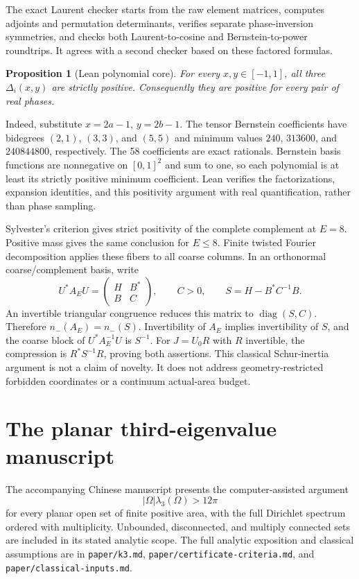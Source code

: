 \documentclass[11pt]{article}
\newtheorem{proposition}{Proposition}
\newcommand{\nminus}{n_{-}}
\begin{document}
The exact Laurent checker starts from the raw element matrices, computes adjoints and permutation determinants, verifies separate phase-inversion symmetries, and checks both Laurent-to-cosine and Bernstein-to-power roundtrips. It agrees with a second checker based on these factored formulas.
\begin{proposition}[Lean polynomial core]
For every $x,y\in[-1,1]$, all three $\Delta_i(x,y)$ are strictly positive. Consequently they are positive for every pair of real phases.
\end{proposition}
Indeed, substitute $x=2a-1$, $y=2b-1$. The tensor Bernstein coefficients have bidegrees $(2,1)$, $(3,3)$, and $(5,5)$ and minimum values $240$, $313600$, and $240844800$, respectively. The 58 coefficients are exact rationals. Bernstein basis functions are nonnegative on $[0,1]^2$ and sum to one, so each polynomial is at least its strictly positive minimum coefficient. Lean verifies the factorizations, expansion identities, and this positivity argument with real quantification, rather than phase sampling.

Sylvester's criterion gives strict positivity of the complete complement at $E=8$. Positive mass gives the same conclusion for $E\leq8$. Finite twisted Fourier decomposition applies these fibers to all coarse columns. In an orthonormal coarse/complement basis, write
\[
 U^*A_EU=\begin{pmatrix}H&B^*\\B&C\end{pmatrix},\qquad C>0,
 \qquad S=H-B^*C^{-1}B.
\]
An invertible triangular congruence reduces this matrix to $\operatorname{diag}(S,C)$. Therefore $\nminus(A_E)=\nminus(S)$. Invertibility of $A_E$ implies invertibility of $S$, and the coarse block of $U^*A_E^{-1}U$ is $S^{-1}$. For $J=U_0R$ with $R$ invertible, the compression is $R^*S^{-1}R$, proving both assertions. This classical Schur-inertia argument is not a claim of novelty. It does not address geometry-restricted forbidden coordinates or a continuum actual-area budget.
\section{The planar third-eigenvalue manuscript}
The accompanying Chinese manuscript presents the computer-assisted argument
\[
 |\Omega|\lambda_3(\Omega)>12\pi
\]
for every planar open set of finite positive area, with the full Dirichlet spectrum ordered with multiplicity. Unbounded, disconnected, and multiply connected sets are included in its stated analytic scope. The full analytic exposition and classical assumptions are in \texttt{paper/k3.md}, \texttt{paper/certificate-criteria.md}, and \texttt{paper/classical-inputs.md}.
\end{document}
